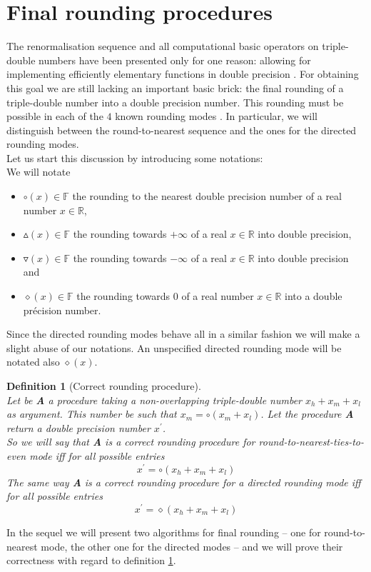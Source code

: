 \documentclass[a4paper,10pt,twoside]{article}
\newtheorem{definition}[theorem]{Definition}
\newcommand{\F}{\ensuremath{\mathbb {F}}}
\newcommand{\R}{\ensuremath{\mathbb {R}}}
\newcommand{\hi}{\ensuremath{\mathit{h}}}
\newcommand{\mi}{\ensuremath{\mathit{m}}}
\newcommand{\lo}{\ensuremath{\mathit{l}}}
\begin{document}
\section{Final rounding procedures}
The renormalisation sequence and all computational basic operators on triple-double numbers have been presented only
for one reason: allowing for implementing efficiently elementary functions in double precision
\cite{Defour-thesis, crlibmweb, DinDefLau2004LIP}. For obtaining this
goal we are still lacking an important basic brick: the final rounding of a triple-double number into a double precision
number. This rounding must be possible in each of the $4$ known rounding modes \cite{IEEE754}. In particular, we will
distinguish between the round-to-nearest sequence and the ones for the directed rounding modes.\\
Let us start this discussion by introducing some notations:\\
We will notate
\begin{itemize}
\item $\circ \left( x \right) \in \F$ the rounding to the nearest double precision number of a real number $x \in \R$,
\item $\vartriangle \left( x \right) \in \F$ the rounding towards $+\infty$ of a real $x \in \R$ into double precision,
\item $\triangledown \left( x \right) \in \F$ the rounding towards $-\infty$ of a real $x \in \R$ into double precision and
\item $\diamond \left( x \right) \in \F$ the rounding towards $0$ of a real number $x \in \R$ into a double pr\'ecision number.
\end{itemize}
Since the directed rounding modes behave all in a similar fashion we will make a slight abuse of our notations. An
unspecified directed rounding mode will be notated also $\diamond \left( x \right)$.
\begin{definition}[Correct rounding procedure] \label{defprocarrcorr} ~ \\
Let be {\bf A} a procedure taking a non-overlapping triple-double number $x_\hi + x_\mi + x_\lo$ as argument. This number be
such that
$x_\mi = \circ \left( x_\mi + x_\lo \right)$.
Let the procedure {\bf A} return a double precision number $x^\prime$.\\
So we will say that {\bf A} is a correct rounding procedure for round-to-nearest-ties-to-even mode iff
for all possible entries
$$x^\prime = \circ \left( x_\hi + x_\mi + x_\lo \right)$$
The same way {\bf A} is a correct rounding procedure for a directed rounding mode iff for all possible entries
$$x^\prime = \diamond \left( x_\hi + x_\mi + x_\lo \right)$$
\end{definition}
In the sequel we will present two algorithms for final rounding -- one for round-to-nearest mode, the other one for
the directed modes -- and we will prove their correctness with regard to definition \ref{defprocarrcorr}.
\end{document}
